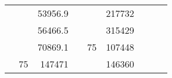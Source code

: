 \begin{table}[H]
\begin{tabular}{|ccrccrccc}
\multicolumn{1}{|c|}{\cellcolor[HTML]{FFFFC7}}                                & \multicolumn{1}{c|}{\cellcolor[HTML]{DAE8FC}}                      & \multicolumn{1}{r|}{\cellcolor[HTML]{DAE8FC}53956.9}   & \multicolumn{1}{c|}{\cellcolor[HTML]{FFFFC7}}                                & \multicolumn{1}{c|}{\cellcolor[HTML]{DAE8FC}}                       & \multicolumn{1}{r|}{\cellcolor[HTML]{DDFDFF}217732}    &                                                                              &                                                                    &                                                        \\ \cline{3-3} \cline{6-6}
\multicolumn{1}{|c|}{\cellcolor[HTML]{FFFFC7}}                                & \multicolumn{1}{c|}{\cellcolor[HTML]{DAE8FC}}                      & \multicolumn{1}{r|}{\cellcolor[HTML]{DDFDFF}56466.5}   & \multicolumn{1}{c|}{\cellcolor[HTML]{FFFFC7}}                                & \multicolumn{1}{c|}{\cellcolor[HTML]{DAE8FC}}                       & \multicolumn{1}{r|}{\cellcolor[HTML]{DAE8FC}315429}    &                                                                              &                                                                    &                                                        \\ \cline{3-3} \cline{6-6}
\multicolumn{1}{|c|}{\cellcolor[HTML]{FFFFC7}}                                & \multicolumn{1}{c|}{\cellcolor[HTML]{DAE8FC}}                      & \multicolumn{1}{r|}{\cellcolor[HTML]{DAE8FC}70869.1}   & \multicolumn{1}{c|}{\cellcolor[HTML]{FFFFC7}}                                & \multicolumn{1}{c|}{\multirow{-10}{*}{\cellcolor[HTML]{DAE8FC}75}}  & \multicolumn{1}{r|}{\cellcolor[HTML]{DDFDFF}107448}    &                                                                              &                                                                    &                                                        \\ \cline{3-3} \cline{5-6}
\multicolumn{1}{|c|}{\cellcolor[HTML]{FFFFC7}}                                & \multicolumn{1}{c|}{\multirow{-10}{*}{\cellcolor[HTML]{DAE8FC}75}} & \multicolumn{1}{r|}{\cellcolor[HTML]{DDFDFF}147471}    & \multicolumn{1}{c|}{\cellcolor[HTML]{FFFFC7}}                                & \multicolumn{1}{c|}{\cellcolor[HTML]{DDFDFF}}                       & \multicolumn{1}{r|}{\cellcolor[HTML]{DAE8FC}146360}    &                                                                              &                                                                    &                                                        \\ \cline{2-3} \cline{6-6}

\end{tabular}
\end{table}
